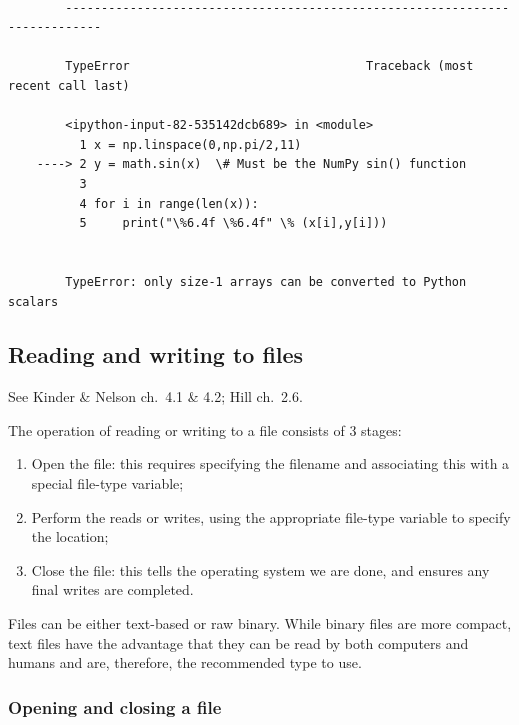 \documentclass[10pt]{article}
\providecommand{\tightlist}{%
      \setlength{\itemsep}{0pt}\setlength{\parskip}{0pt}}
\begin{document}
    \begin{Verbatim}[commandchars=\\\{\}]

        ---------------------------------------------------------------------------

        TypeError                                 Traceback (most recent call last)

        <ipython-input-82-535142dcb689> in <module>
          1 x = np.linspace(0,np.pi/2,11)
    ----> 2 y = math.sin(x)  \# Must be the NumPy sin() function
          3 
          4 for i in range(len(x)):
          5     print("\%6.4f \%6.4f" \% (x[i],y[i]))


        TypeError: only size-1 arrays can be converted to Python scalars

    \end{Verbatim}

    \hypertarget{reading-and-writing-to-files}{%
\subsection{Reading and writing to
files}\label{reading-and-writing-to-files}}

See Kinder \& Nelson ch.~4.1 \& 4.2; Hill ch.~2.6.

The operation of reading or writing to a file consists of 3 stages:

\begin{enumerate}
\def\labelenumi{\arabic{enumi}.}
\tightlist
\item
  Open the file: this requires specifying the filename and associating
  this with a special file-type variable;
\item
  Perform the reads or writes, using the appropriate file-type variable
  to specify the location;
\item
  Close the file: this tells the operating system we are done, and
  ensures any final writes are completed.
\end{enumerate}

Files can be either text-based or raw binary. While binary files are
more compact, text files have the advantage that they can be read by
both computers and humans and are, therefore, the recommended type to
use.

\hypertarget{opening-and-closing-a-file}{%
\subsubsection{Opening and closing a
file}\label{opening-and-closing-a-file}}
\end{document}
